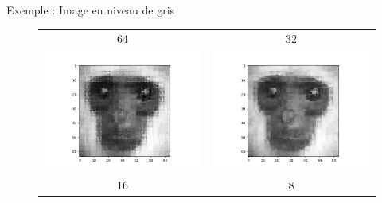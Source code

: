 \documentclass{beamer}
\begin{document}
\begin{frame}{Exemple : Image en niveau de gris}
\begin{center}
\begin{figure}
\begin{tiny}
\begin{tabular}{cc}
64 &  32\\
\includegraphics[scale=0.23]{images/monkey64-4.png} & 
\includegraphics[scale=0.23]{images/monkey32-4.png} \\
16 & 8 \\

\end{tabular}
\end{tiny}
\end{figure}
\end{center}
\end{frame}
\end{document}
